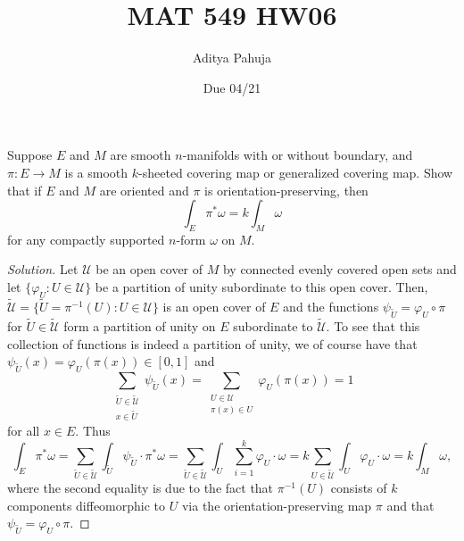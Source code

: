 \documentclass[10pt]{article}
\title{MAT 549 HW06}
\author{\large Aditya Pahuja}
\date{\large Due 04/21}
\providecommand{\inv}{^{-1}}
\newenvironment{soln}{\begin{proof}[Solution]}{\end{proof}}
\begin{document}
\maketitle

\begin{problem}
    [16-3(a)]
    Suppose $E$ and $M$ are smooth $n$-manifolds
    with or without boundary, and $\pi\colon E\to M$ is
    a smooth $k$-sheeted covering map or generalized covering map.
    Show that if $E$ and $M$ are oriented and
    $\pi$ is orientation-preserving, then
    \begin{equation*}
        \int_E\pi^*\omega = k\int_M\omega
    \end{equation*}
    for any compactly supported $n$-form $\omega$ on $M$.
\end{problem}

\begin{soln}
    Let $\mathcal U$ be an open cover of $M$ by connected
    evenly covered open sets and let $\{\varphi_U : U\in\mathcal U\}$
    be a partition of unity subordinate to this open cover.
    Then, $\tilde{\mathcal U} = \{\tilde U = \pi\inv(U) : U\in\mathcal U\}$
    is an open cover of $E$ and the functions
    $\psi_{\tilde U} = \varphi_U\circ\pi$ for $\tilde U\in\tilde{\mathcal U}$
    form a partition of unity on $E$ subordinate to $\tilde{\mathcal U}$.
    To see that this collection of functions is indeed a partition of unity,
    we of course have that $\psi_{\tilde U}(x) = \varphi_U(\pi(x))\in[0,1]$
    and
    \begin{equation*}
	\sum_{\substack{\tilde U\in\tilde{\mathcal U}\\ x\in\tilde U}}
	\psi_{\tilde U}(x) =
	\sum_{\substack{U\in{\mathcal U}\\ \pi(x)\in U }}
	\varphi_U(\pi(x)) = 1
    \end{equation*}
    for all $x\in E$. Thus
    \begin{equation*}
        \int_E \pi^*\omega
	= \sum_{\tilde U\in\tilde{\mathcal U}}
	\int_{\tilde U}\psi_{\tilde U}\cdot\pi^*\omega
	= \sum_{\tilde U\in\tilde{\mathcal U}}
	\int_{U}\sum_{i=1}^k\varphi_{U}\cdot\omega
	= k\sum_{U\in\tilde{\mathcal U}}\int_U \varphi_U\cdot\omega
	= k\int_M\omega,
    \end{equation*}
    where the second equality is due to the fact that
    $\pi\inv(U)$ consists of $k$ components diffeomorphic to $U$ via
    the orientation-preserving map $\pi$
    and that $\psi_{\tilde U} = \varphi_U\circ\pi$.
\end{soln}
\end{document}
